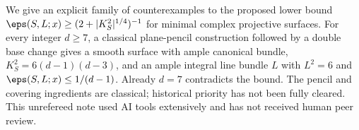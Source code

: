 We give an explicit family of counterexamples to the proposed lower bound
$\eps(S,L;x)\ge (2+|K_S^2|^{1/4})^{-1}$ for minimal complex projective
surfaces. For every integer $d\ge7$, a classical plane-pencil construction
followed by a double base change gives a smooth surface with ample canonical
bundle, $K_S^2=6(d-1)(d-3)$, and an ample integral line bundle $L$ with
$L^2=6$ and $\eps(S,L;x)\le1/(d-1)$. Already $d=7$ contradicts the bound.
The pencil and covering ingredients are classical; historical priority has
not been fully cleared. This unrefereed note used AI tools extensively and
has not received human peer review.
